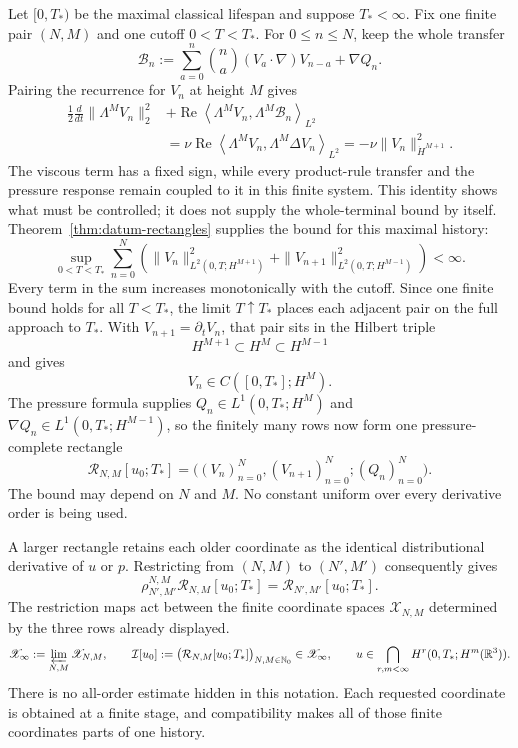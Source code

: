 Let \([0,T_*)\) be the maximal classical lifespan and suppose
\(T_*<\infty\).  Fix one finite pair \((N,M)\) and one cutoff
\(0<T<T_*\).  For \(0\le n\le N\), keep the whole transfer
\[
 \mathcal B_n
 :=\sum_{a=0}^{n}\binom na(V_a\!\cdot\nabla)V_{n-a}+\nabla Q_n.
\]
Pairing the recurrence for \(V_n\) at height \(M\) gives
\[
\begin{aligned}
 \frac12\frac{d}{dt}\|\Lambda^M V_n\|_2^2
 &+\operatorname{Re}\left\langle
   \Lambda^M V_n,\Lambda^M\mathcal B_n
  \right\rangle_{L^2}\\
 &=\nu\operatorname{Re}\left\langle
   \Lambda^M V_n,\Lambda^M\Delta V_n
  \right\rangle_{L^2}
 =-\nu\|V_n\|_{\dot H^{M+1}}^2.
\end{aligned}
\]
The viscous term has a fixed sign, while every product-rule transfer and the
pressure response remain coupled to it in this finite system.  This identity
shows what must be controlled; it does not supply the whole-terminal bound by
itself.  Theorem~\ref{thm:datum-rectangles} supplies the bound for this maximal
history:
\[
 \sup_{0<T<T_*}\sum_{n=0}^{N}\left(
  \|V_n\|_{L^2(0,T;H^{M+1})}^2
  +\|V_{n+1}\|_{L^2(0,T;H^{M-1})}^2
 \right)<\infty.
\]
Every term in the sum increases monotonically with the cutoff.  Since one
finite bound holds for all \(T<T_*\), the limit \(T\uparrow T_*\) places each
adjacent pair on the full approach to \(T_*\).  With
\(V_{n+1}=\partial_tV_n\), that pair sits in the Hilbert triple
\[
 H^{M+1}\subset H^M\subset H^{M-1}
\]
and gives
\[
 V_n\in C([0,T_*];H^M).
\]
The pressure formula supplies
\(Q_n\in L^1(0,T_*;H^M)\) and
\(\nabla Q_n\in L^1(0,T_*;H^{M-1})\), so the finitely many rows now form one
pressure-complete rectangle
\[
 \mathcal R_{N,M}[u_0;T_*]
 =\bigl((V_n)_{n=0}^{N},(V_{n+1})_{n=0}^{N};(Q_n)_{n=0}^{N}\bigr).
\]
The bound may depend on \(N\) and \(M\).  No constant uniform over every
derivative order is being used.

A larger rectangle retains each older coordinate as the identical
distributional derivative of \(u\) or \(p\).  Restricting from
\((N,M)\) to \((N',M')\) consequently gives
\[
 \rho_{N',M'}^{N,M}\mathcal R_{N,M}[u_0;T_*]
 =\mathcal R_{N',M'}[u_0;T_*].
\]
The restriction maps act between the finite coordinate spaces
\(\mathscr X_{N,M}\) determined by the three rows already displayed.
\[
 \mathscr X_\infty:=\varprojlim_{N,M}\mathscr X_{N,M},
 \qquad
 \mathcal I[u_0]
 :=\bigl(\mathcal R_{N,M}[u_0;T_*]\bigr)_{N,M\in\mathbb N_0}
 \in\mathscr X_\infty,
 \qquad
 u\in\bigcap_{r,m<\infty}H^r(0,T_*;H^m(\mathbb R^3)).
\]
There is no all-order estimate hidden in this notation.  Each requested
coordinate is obtained at a finite stage, and compatibility makes all of
those finite coordinates parts of one history.

